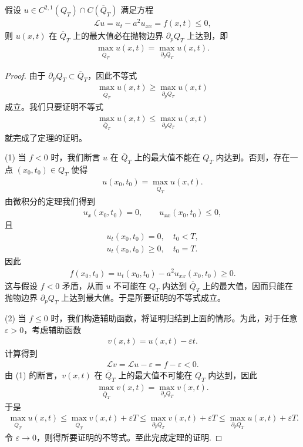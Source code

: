 \documentclass[../../main.tex]{subfiles}%
\begin{document}
\begin{theorem}[极值原理]\label{theorem:PDE极值原理}
假设 $u\in C^{2,1}(Q_T)\cap C(\overline{Q}_T)$ 满足方程 \begin{align*}
\mathcal{L}u=u_t-a^2u_{xx}=f(x,t)\leqslant 0,
\end{align*}
则 $u(x,t)$ 在 $\overline{Q}_T$ 上的最大值必在抛物边界 $\partial_p Q_T$ 上达到，即
\begin{align*}
\max_{\overline{Q}_T}u(x,t)=\max_{\partial_p Q_T}u(x,t).
\end{align*}
\end{theorem}
\begin{proof}
由于 $\partial_p Q_T\subset\overline{Q}_T$，因此不等式
\begin{align*}
\max_{\overline{Q}_T}u(x,t)\geqslant \max_{\partial_p Q_T}u(x,t)
\end{align*}
成立。我们只要证明不等式
\begin{align*}
\max_{\overline{Q}_T}u(x,t)\leqslant \max_{\partial_p Q_T}u(x,t)
\end{align*}
就完成了定理的证明。

(1) 当 $f<0$ 时，我们断言 $u$ 在 $\overline{Q}_T$ 上的最大值不能在 $Q_T$ 内达到。否则，存在一点 $(x_0,t_0)\in Q_T$ 使得
\begin{align*}
u(x_0,t_0)=\max_{\overline{Q}_T}u(x,t).
\end{align*}
由微积分的定理我们得到
\begin{align*}
u_x(x_0,t_0)=0,\qquad u_{xx}(x_0,t_0)\leqslant 0,
\end{align*}
且
\begin{align*}
u_t(x_0,t_0)=0,\quad t_0<T,\\
u_t(x_0,t_0)\geqslant 0,\quad t_0=T.
\end{align*}
因此
\begin{align*}
f(x_0,t_0)=u_t(x_0,t_0)-a^2u_{xx}(x_0,t_0)\geqslant 0.
\end{align*}
这与假设 $f<0$ 矛盾，从而 $u$ 不可能在 $Q_T$ 内达到 $\overline{Q}_T$ 上的最大值，因而只能在抛物边界 $\partial_p Q_T$ 上达到最大值。于是所要证明的不等式成立。

(2) 当 $f\leqslant 0$ 时，我们构造辅助函数，将证明归结到上面的情形。为此，对于任意 $\varepsilon>0$，考虑辅助函数
\begin{align*}
v(x,t)=u(x,t)-\varepsilon t.
\end{align*}
计算得到
\begin{align*}
\mathcal{L}v=\mathcal{L}u-\varepsilon=f-\varepsilon<0.
\end{align*}
由 (1) 的断言，$v(x,t)$ 在 $\overline{Q}_T$ 上的最大值不可能在 $Q_T$ 内达到，因此
\begin{align*}
\max_{\overline{Q}_T}v(x,t)=\max_{\partial_p Q_T}v(x,t).
\end{align*}
于是
\begin{align*}
\max_{\overline{Q}_T}u(x,t)\leqslant \max_{\overline{Q}_T}v(x,t)+\varepsilon T 
\leqslant \max_{\partial_p Q_T}v(x,t)+\varepsilon T 
\leqslant \max_{\partial_p Q_T}u(x,t)+\varepsilon T.
\end{align*}
令 $\varepsilon\to 0$，则得所要证明的不等式。至此完成定理的证明.
\end{proof}
\end{document}
